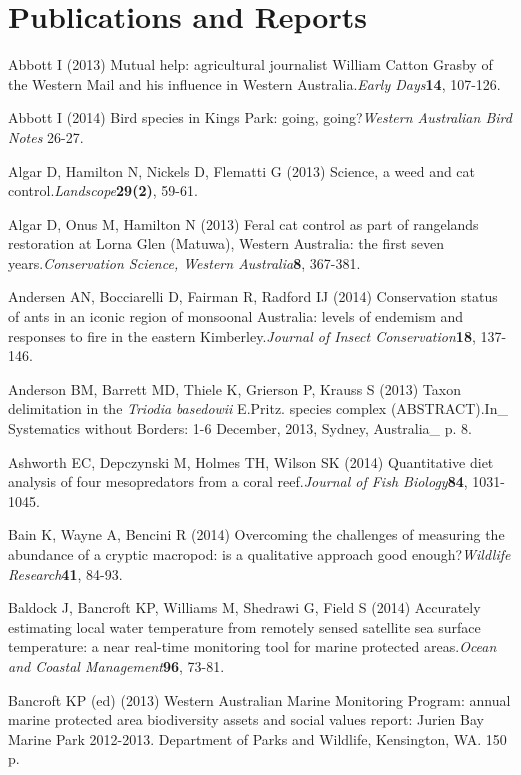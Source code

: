 \documentclass[version=last, paper=a4, DIV=18, usenames, dvipsnames]{scrartcl}
\begin{document}
\clearpage

    

\section{Publications and Reports}



Abbott I (2013) Mutual help: agricultural journalist William Catton Grasby of the Western Mail and his influence in Western Australia.\emph{Early Days}\textbf{14}, 107-126.


Abbott I (2014) Bird species in Kings Park: going, going?\emph{Western Australian Bird Notes} 26-27.


Algar D, Hamilton N, Nickels D, Flematti G (2013) Science, a weed and cat control.\emph{Landscope}\textbf{29(2)}, 59-61.


Algar D, Onus M, Hamilton N (2013) Feral cat control as part of rangelands restoration at Lorna Glen (Matuwa), Western Australia: the first seven years.\emph{Conservation Science, Western Australia}\textbf{8}, 367-381.


Andersen AN, Bocciarelli D, Fairman R, Radford IJ (2014) Conservation status of ants in an iconic region of monsoonal Australia: levels of endemism and responses to fire in the eastern Kimberley.\emph{Journal of Insect Conservation}\textbf{18}, 137-146.


Anderson BM, Barrett MD, Thiele K, Grierson P, Krauss S (2013) Taxon delimitation in the \emph{Triodia} \emph{basedowii} E.Pritz. species complex (ABSTRACT).In_ Systematics without Borders: 1-6 December, 2013, Sydney, Australia_ p. 8.


Ashworth EC, Depczynski M, Holmes TH, Wilson SK (2014) Quantitative diet analysis of four mesopredators from a coral reef.\emph{Journal of Fish Biology}\textbf{84}, 1031-1045.


Bain K, Wayne A, Bencini R (2014) Overcoming the challenges of measuring the abundance of a cryptic macropod: is a qualitative approach good enough?\emph{Wildlife Research}\textbf{41}, 84-93.


Baldock J, Bancroft KP, Williams M, Shedrawi G, Field S (2014) Accurately estimating local water temperature from remotely sensed satellite sea surface temperature: a near real-time monitoring tool for marine protected areas.\emph{Ocean and Coastal Management}\textbf{96}, 73-81.


Bancroft KP (ed) (2013) Western Australian Marine Monitoring Program: annual marine protected area biodiversity assets and social values report: Jurien Bay Marine Park 2012-2013. Department of Parks and Wildlife, Kensington, WA. 150 p.
\end{document}

